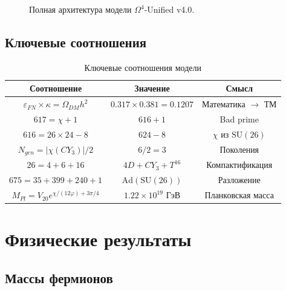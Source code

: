 \documentclass[12pt,a4paper,twoside]{article}
\newcommand{\SU}{\mathrm{SU}}
\newcommand{\Ad}{\mathrm{Ad}}
\newcommand{\EPS}{\varepsilon}
\theoremstyle{definition}
\begin{document}
\begin{figure}[H]
\caption{Полная архитектура модели $\Omega^4$-Unified v4.0.}
\label{fig:architecture}
\end{figure}

\subsection{Ключевые соотношения}

\begin{table}[H]
\centering
\small
\caption{Ключевые соотношения модели}
\label{tab:key_relations}
\begin{tabular}{c|c|c}
\toprule
\textbf{Соотношение} & \textbf{Значение} & \textbf{Смысл} \\
\midrule
$\EPS_{FN} \times \kappa = \Omega_{DM}h^2$ & $0.317 \times 0.381 = 0.1207$ & Математика $\to$ ТМ \\
$617 = \chi + 1$ & $616 + 1$ & Bad prime \\
$616 = 26 \times 24 - 8$ & $624 - 8$ & $\chi$ из $\SU(26)$ \\
$N_{gen} = |\chi(CY_3)|/2$ & $6/2 = 3$ & Поколения \\
$26 = 4 + 6 + 16$ & $4D + CY_3 + T^{16}$ & Компактификация \\
$675 = 35 + 399 + 240 + 1$ & $\Ad(\SU(26))$ & Разложение \\
$M_{Pl} = V_{20} e^{\chi/(12\varphi) + 3\pi/4}$ & $1.22 \times 10^{19}$ ГэВ & Планковская масса \\
\bottomrule
\end{tabular}
\end{table}

\section{Физические результаты}
\label{sec:physics}

\subsection{Массы фермионов}
\end{document}
